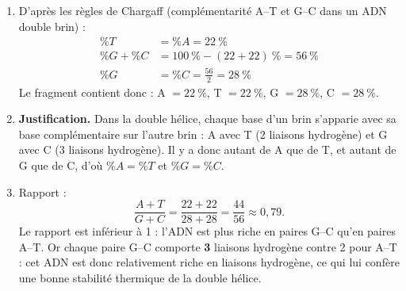 \documentclass[11pt]{article}
\newcommand{\cle}[1]{{\popxbold\color{popdark}#1}}
\begin{document}
\begin{corrige}
\begin{enumerate}
\item D'après les règles de Chargaff (complémentarité A--T et G--C dans un ADN double brin) :
\begin{align*}
\%T &= \%A = 22~\% \\
\%G + \%C &= 100~\% - (22 + 22)~\% = 56~\% \\
\%G &= \%C = \frac{56}{2} = 28~\%
\end{align*}
Le fragment contient donc : A $= 22~\%$, T $= 22~\%$, G $= 28~\%$, C $= 28~\%$.
\item \textbf{Justification.} Dans la double hélice, chaque base d'un brin s'apparie avec sa base complémentaire sur l'autre brin : A avec T (2 liaisons hydrogène) et G avec C (3 liaisons hydrogène). Il y a donc autant de A que de T, et autant de G que de C, d'où $\%A = \%T$ et $\%G = \%C$.
\item Rapport :
\[ \frac{A + T}{G + C} = \frac{22 + 22}{28 + 28} = \frac{44}{56} \approx 0{,}79. \]
Le rapport est inférieur à 1 : l'ADN est plus riche en paires G--C qu'en paires A--T. Or chaque paire G--C comporte \textbf{3} liaisons hydrogène contre 2 pour A--T : cet ADN est donc relativement \cle{riche en liaisons hydrogène}, ce qui lui confère une bonne stabilité thermique de la double hélice.
\end{enumerate}
\end{corrige}
\end{document}
